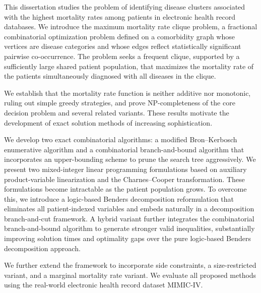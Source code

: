 \par This dissertation studies the problem of identifying disease clusters
associated with the highest mortality rates among patients in
electronic health record databases. We introduce the maximum
mortality rate clique problem, a fractional combinatorial
optimization problem defined on a comorbidity graph whose vertices are
disease categories and whose edges reflect statistically significant
pairwise co-occurrence. The problem seeks a frequent clique, supported
by a sufficiently large shared patient population, that maximizes the
mortality rate of the patients simultaneously diagnosed with all
diseases in the clique.
\par We establish that the mortality rate function is neither additive nor
monotonic, ruling out simple greedy strategies, and prove
NP-completeness of the core decision problem and several related
variants. These results motivate the development of exact solution
methods of increasing sophistication.
\par We develop two exact combinatorial algorithms: a modified
Bron--Kerbosch enumerative algorithm and a combinatorial
branch-and-bound algorithm that incorporates an upper-bounding scheme
to prune the search tree aggressively. We present two mixed-integer
linear programming formulations based on auxiliary product-variable
linearization and the Charnes--Cooper transformation. These
formulations become intractable as the patient population grows. To
overcome this, we introduce a logic-based Benders decomposition
reformulation that eliminates all patient-indexed variables and embeds
naturally in a decomposition branch-and-cut framework. A hybrid
variant further integrates the combinatorial branch-and-bound
algorithm to generate stronger valid inequalities, substantially
improving solution times and optimality gaps over the pure
logic-based Benders decomposition approach.
\par We further extend the framework to incorporate side constraints, a
size-restricted variant, and a marginal mortality rate variant. We
evaluate all proposed methods using the real-world electronic health
record dataset MIMIC-IV.